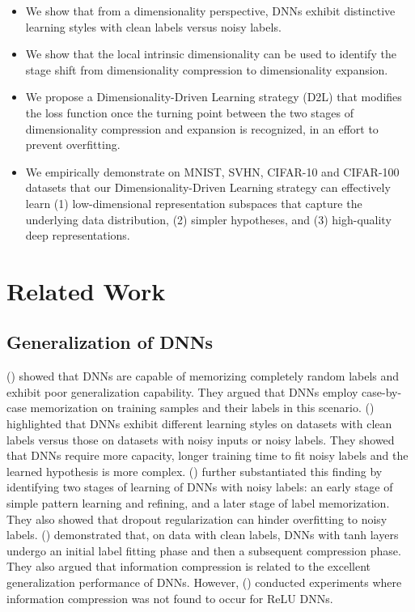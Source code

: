 \documentclass{article}
\begin{document}
\begin{itemize}
  \item We show that from a dimensionality perspective, DNNs exhibit distinctive learning styles with clean labels versus noisy labels.
  
  \item We show that the local intrinsic dimensionality can be used to identify the stage shift from dimensionality compression to dimensionality expansion.
  
  \item We propose a Dimensionality-Driven Learning strategy (D2L) that modifies the loss function once the turning point between the two stages of dimensionality compression and expansion is recognized, in an effort to prevent overfitting.
  
  \item We empirically demonstrate on MNIST, SVHN, CIFAR-10 and CIFAR-100 datasets that our Dimensionality-Driven Learning strategy can effectively learn (1) low-dimensional representation subspaces that capture the underlying data distribution, (2) simpler hypotheses, and (3) high-quality deep representations.
\end{itemize}

\section{Related Work}
\label{sec:related}

\subsection{Generalization of DNNs}
\citeauthor{zhang2016understanding} (\citeyear{zhang2016understanding}) showed that DNNs are capable of memorizing completely random labels and exhibit poor generalization capability. They argued that DNNs employ case-by-case memorization on training samples and their labels in this scenario.
\citeauthor{krueger2017deep} (\citeyear{krueger2017deep}) highlighted that DNNs exhibit different learning styles on datasets with clean labels versus those on datasets with noisy inputs or noisy labels. They showed that DNNs require more capacity, longer training time to fit noisy labels and the learned hypothesis is more complex. \citeauthor{arpit2017closer} (\citeyear{arpit2017closer}) further substantiated this finding by identifying two stages of learning of DNNs with noisy labels: an early stage of simple pattern learning and refining, and a later stage of label memorization. They also showed that dropout regularization can hinder overfitting to noisy labels. \citeauthor{shwartz2017opening} (\citeyear{shwartz2017opening}) demonstrated that, on data with clean labels, DNNs with tanh layers undergo an initial label fitting phase and then a subsequent compression phase. They also argued that information compression is related to the excellent generalization performance of DNNs. However, \citeauthor{michael2018on} (\citeyear{michael2018on}) conducted experiments where information compression was not found to occur for ReLU \cite{glorot2011deep} DNNs.
\end{document}
